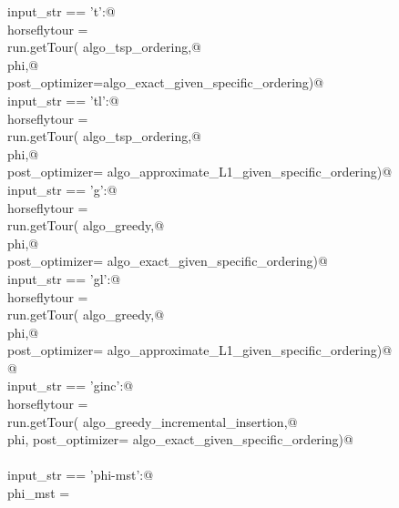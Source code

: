 \documentclass[11.5pt]{report}
\begin{document}
\begin{flushleft}
\begin{list}{}{}
\mbox{}\verb@elif input_str == 't':@\\
\mbox{}\verb@      horseflytour = \@\\
\mbox{}\verb@             run.getTour( algo_tsp_ordering,@\\
\mbox{}\verb@                          phi,@\\
\mbox{}\verb@                          post_optimizer=algo_exact_given_specific_ordering)@\\
\mbox{}\verb@elif input_str == 'tl':@\\
\mbox{}\verb@      horseflytour = \@\\
\mbox{}\verb@             run.getTour( algo_tsp_ordering,@\\
\mbox{}\verb@                          phi,@\\
\mbox{}\verb@                          post_optimizer= algo_approximate_L1_given_specific_ordering)@\\
\mbox{}\verb@elif input_str == 'g':@\\
\mbox{}\verb@      horseflytour = \@\\
\mbox{}\verb@             run.getTour( algo_greedy,@\\
\mbox{}\verb@                          phi,@\\
\mbox{}\verb@                          post_optimizer= algo_exact_given_specific_ordering)@\\
\mbox{}\verb@elif input_str == 'gl':@\\
\mbox{}\verb@      horseflytour = \@\\
\mbox{}\verb@             run.getTour( algo_greedy,@\\
\mbox{}\verb@                          phi,@\\
\mbox{}\verb@                          post_optimizer= algo_approximate_L1_given_specific_ordering)@\\
\mbox{}\verb@                          @\\
\mbox{}\verb@elif input_str == 'ginc':@\\
\mbox{}\verb@      horseflytour = \@\\
\mbox{}\verb@             run.getTour( algo_greedy_incremental_insertion,@\\
\mbox{}\verb@                          phi, post_optimizer= algo_exact_given_specific_ordering)@\\
\mbox{}\verb@@\\
\mbox{}\verb@elif input_str == 'phi-mst':@\\
\mbox{}\verb@      phi_mst = \@\\

\end{list}
\end{flushleft}
\end{document}

